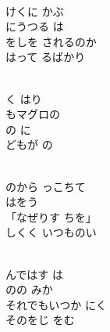 \documentclass[10pt,b5j]{tarticle} %
\begin{document}
\begin{enumerate}
\begin{minipage}[c]{\blocksize}
    \end{minipage}
    \begin{minipage}[c]{\blocksize}

        \vspace{\linespace}
        \item~\\
        けくに かぶ\\
        にうつる は\\
        をしを されるのか\\
        はって るばかり
        
        \vspace{\linespace}
        \item~\\
        く はり\\
        もマグロの \\
        の に\\
        どもが の
        
        \vspace{\linespace}
        \item~\\
        のから っこちて\\
        はをう \\
        「なぜりす ちを」\\
        しくく いつものい
        
        \vspace{\linespace}
        \item~\\
        んではす は\\
        のの みか\\
        それでもいつか にく\\
        そのをじ をむ
        

\end{minipage}
\end{enumerate}
\end{document}
